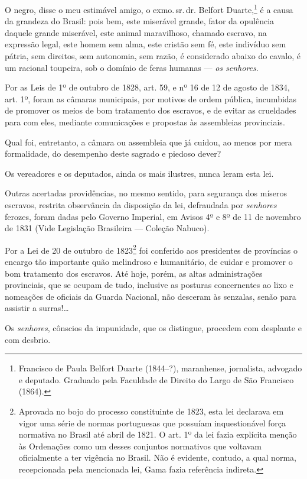O negro, disse o meu estimável amigo, o exmo.\,sr.\,dr. Belfort
Duarte,\footnote{Francisco de Paula Belfort Duarte (1844--?),
  maranhense, jornalista, advogado e deputado. Graduado pela Faculdade
  de Direito do Largo de São Francisco (1864).} é a causa da grandeza do
Brasil: pois bem, este miserável grande, fator da opulência daquele
grande miserável, este animal maravilhoso, chamado escravo, na expressão
legal, este homem sem alma, este cristão sem fé, este indivíduo sem
pátria, sem direitos, sem autonomia, sem razão, é considerado abaixo do
cavalo, é um racional toupeira, sob o domínio de feras humanas ---
\emph{os senhores}.

Por as Leis de 1º de outubro de 1828, art. 59, e nº 16 de 12 de agosto
de 1834, art. 1º, foram as câmaras municipais, por motivos de ordem
pública, incumbidas de promover os meios de bom tratamento dos escravos,
e de evitar as crueldades para com eles, mediante comunicações e
propostas às assembleias provinciais.

Qual foi, entretanto, a câmara ou assembleia que já cuidou, ao menos por
mera formalidade, do desempenho deste sagrado e piedoso dever?

Os vereadores e os deputados, ainda os mais ilustres, nunca leram esta
lei.

Outras acertadas providências, no mesmo sentido, para segurança dos
míseros escravos, restrita observância da disposição da lei, defraudada
por \emph{senhores} ferozes, foram dadas pelo Governo Imperial, em
Avisos 4º e 8º de 11 de novembro de 1831 (Vide Legislação
Brasileira --- Coleção Nabuco).

Por a Lei de 20 de outubro de 1823\footnote{Aprovada no bojo do
  processo constituinte de 1823, esta lei declarava em vigor uma série
  de normas portuguesas que possuíam inquestionável força normativa no
  Brasil até abril de 1821. O art. 1º da lei fazia explícita menção às
  Ordenações como um desses conjuntos normativos que voltavam
  oficialmente a ter vigência no Brasil. Não é evidente, contudo, a qual
  norma, recepcionada pela mencionada lei, Gama fazia referência indireta.}
foi conferido aos presidentes de províncias o encargo tão importante
quão melindroso e humanitário, de cuidar e promover o bom tratamento dos
escravos. Até hoje, porém, as altas administrações provinciais, que se
ocupam de tudo, inclusive as posturas concernentes ao lixo e nomeações
de oficiais da Guarda Nacional, não desceram às senzalas, senão para
assistir a surras!\ldots{}

Os \emph{senhores}, cônscios da impunidade, que os distingue, procedem
com desplante e com desbrio.

